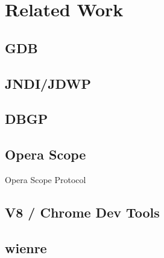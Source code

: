 
\section{Related Work}
\subsection{GDB}

\subsection{JNDI/JDWP}

\subsection{DBGP}

\subsection{Opera Scope}
Opera Scope Protocol \cite{opera-scope}

\subsection{V8 / Chrome Dev Tools}

\subsection{wienre}

